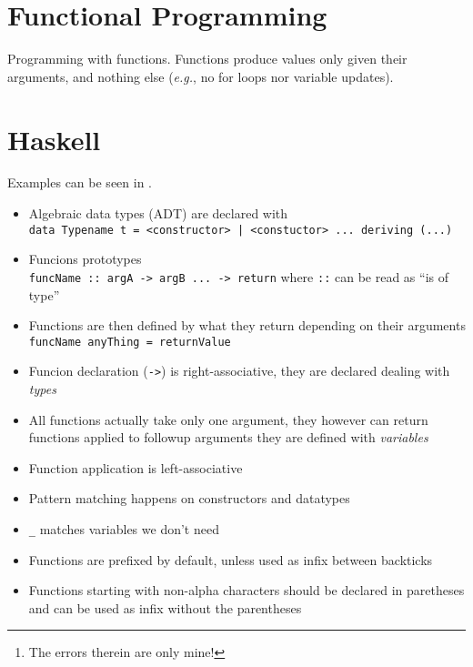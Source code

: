 \documentclass[a4paper]{article}
\title{\theTitle}
\author{\theAuthor\thanks{The errors therein are only mine!}}
\date{23--24 January 20133}
\newcommand{\latinlocution}[1]{\textit{#1}}
\newcommand{\eg}{\latinlocution{e.g.}}
\begin{document}
\maketitle

\section{Functional Programming}

Programming with functions. Functions produce values only given their arguments,
and nothing else (\eg, no for loops nor variable updates).

\section{Haskell}

Examples can be seen in .

\begin{itemize}
  \item Algebraic data types (ADT) are declared with\\
    \verb_data Typename t = <constructor> | <constuctor> ... deriving (...)_
  \item Funcions prototypes \\
    \verb_funcName :: argA -> argB ... -> return_ where \verb_::_ can be read as
    ``is of type''
  \item Functions are then defined by what they return depending on their
    arguments
    \verb_funcName anyThing = returnValue_
  \item Funcion declaration (\verb_->_) is right-associative, they are declared dealing with \emph{types}

  \item All functions actually take only one argument, they however can return
    functions applied to followup arguments they are defined with
    \emph{variables}
  \item Function application is left-associative
  \item Pattern matching happens on constructors and datatypes
  \item \verb#_# matches variables we don't need
  \item Functions are prefixed by default, unless used as infix between
    backticks
  \item Functions starting with non-alpha characters should be declared in
    paretheses and can be used as infix without the parentheses
\end{itemize}
\end{document}
